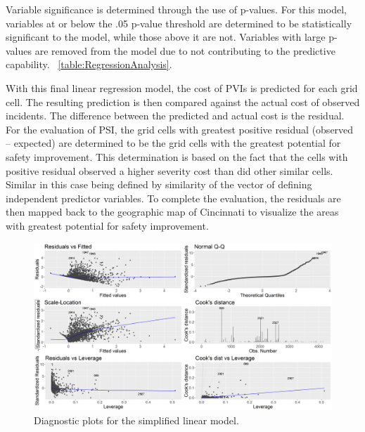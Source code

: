\documentclass{llncs}
\begin{document}
Variable significance is determined through the use of p-values. For this model, variables at or below the .05 p-value threshold are determined to be statistically significant to the model, while those above it are not. Variables with large p-values are removed from the model due to not contributing to the predictive capability.  ~\ref{table:RegressionAnalysis}. 

With this final linear regression model, the cost of PVIs is predicted for each grid cell. The resulting prediction is then compared against the actual cost of observed incidents. The difference between the predicted and actual cost is the residual. For the evaluation of PSI, the grid cells with greatest positive residual (observed – expected) are determined to be the grid cells with the greatest potential for safety improvement. This determination is based on the fact that the cells with positive residual observed a higher severity cost than did other  similar  cells. Similar in this case being defined by similarity of the vector of defining independent predictor variables. To complete the evaluation, the residuals are then mapped back to the geographic map of Cincinnati to visualize the areas with greatest potential for safety improvement.

\FloatBarrier
\begin{figure}
 	\includegraphics[width=\textwidth, height=\textheight, keepaspectratio]{000LinearModelReducedDiagnostics.png}
 	\caption{Diagnostic plots for the simplified linear model.}
	\label{figure:Diags}

\end{figure}
\FloatBarrier
\end{document}
